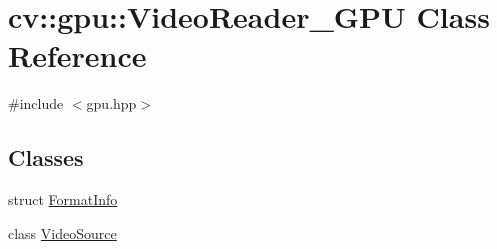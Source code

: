 \hypertarget{classcv_1_1gpu_1_1VideoReader__GPU}{\section{cv\-:\-:gpu\-:\-:Video\-Reader\-\_\-\-G\-P\-U Class Reference}
\label{classcv_1_1gpu_1_1VideoReader__GPU}
}


{\ttfamily \#include $<$gpu.\-hpp$>$}

\subsection*{Classes}
\begin{DoxyCompactItemize}
\item 
struct \hyperlink{structcv_1_1gpu_1_1VideoReader__GPU_1_1FormatInfo}{Format\-Info}
\item 
class \hyperlink{classcv_1_1gpu_1_1VideoReader__GPU_1_1VideoSource}{Video\-Source}
\end{DoxyCompactItemize}
